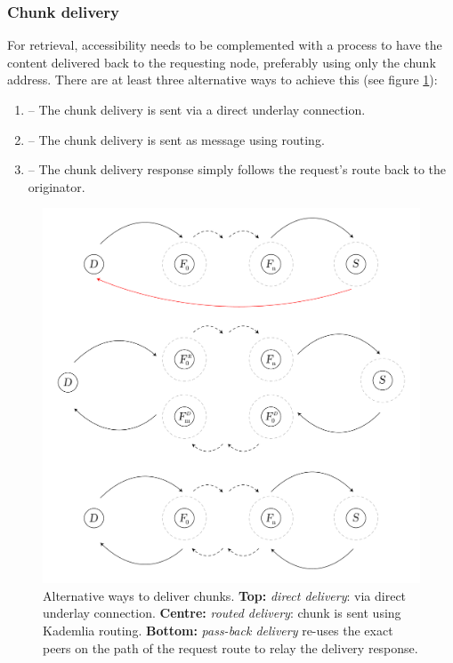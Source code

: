\subsubsection{Chunk delivery}

For retrieval, accessibility needs to be complemented with a process to have the content delivered back to the requesting node, preferably using only the chunk address. There are at least three alternative ways to achieve this (see figure \ref{fig:chunk-delivery}):

\begin{enumerate}
    \item {} -- The chunk delivery is sent via a direct underlay connection. 
    \item {} -- The chunk delivery is sent as message using routing.
    \item {} -- The chunk delivery response simply follows the request's route back to the originator.
\end{enumerate}


\begin{figure}[htbp]
   \centering
   \includegraphics[width=\textwidth]{fig/chunk-delivery.pdf}
   \caption[Alternative ways to deliver chunks: direct, routed and pass-back \statusgreen]{Alternative ways to deliver chunks. \textbf{Top:} \emph{direct delivery}: via direct underlay connection. \textbf{Centre:} \emph{routed delivery}: chunk is sent using Kademlia routing. \textbf{Bottom:}  \emph{pass-back delivery} re-uses the exact peers on the path of the request route to relay the delivery response.}
   \label{fig:chunk-delivery}
\end{figure}

